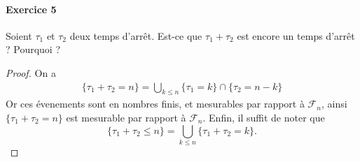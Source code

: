 \documentclass{article}
\theoremstyle{definition}
\numberwithin{equation}{section}
\DeclareMathOperator{\E}{\mathbb{E}}
\begin{document}
\paragraph{Exercice 5}
Soient $\tau_1$ et $\tau_2$ deux temps d'arrêt. Est-ce que $\tau_1+\tau_2$ est encore un temps d'arrêt ? Pourquoi ?

\begin{proof}
On a 
\begin{align*}
    \{\tau_1+\tau_2 = n\} = \bigcup_{k\leq n}\{\tau_1=k\}\cap\{\tau_2=n-k\}
\end{align*}
Or ces évenements sont en nombres finis, et mesurables par rapport à $\mathcal{F}_n$, ainsi $\{\tau_1+\tau_2 = n\}$ est mesurable par rapport à $\mathcal{F}_n$. Enfin, il suffit de noter que 
$$\{\tau_1+\tau_2 \leq n\} = \bigcup_{k\leq n} \{\tau_1+\tau_2 = k\}.$$
\end{proof}



\end{document}

